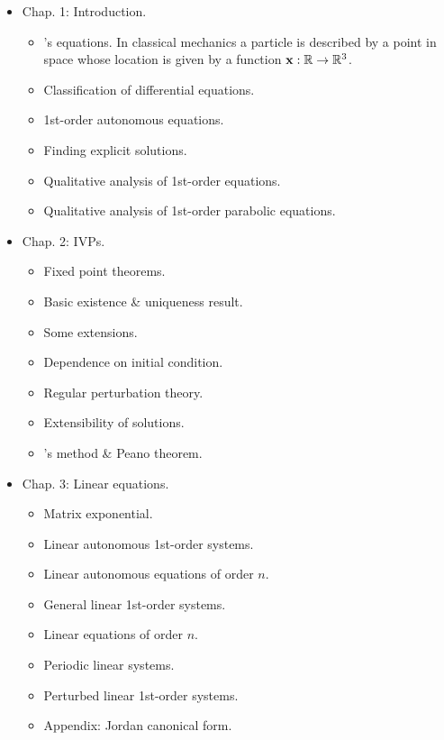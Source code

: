 \documentclass{article}
\begin{document}
\begin{enumerate}
	\begin{itemize}
		\item {\sf Chap. 1: Introduction.}
		\begin{itemize}
			\item {'s equations.} In classical mechanics a particle is described by a point in space whose location is given by a function ${\bf x}:\mathbb{R}\to\mathbb{R}^3$.
			\item {\sf Classification of differential equations.}
			\item {\sf 1st-order autonomous equations.}
			\item {\sf Finding explicit solutions.}
			\item {\sf Qualitative analysis of 1st-order equations.}
			\item {\sf Qualitative analysis of 1st-order parabolic equations.}
		\end{itemize}
		\item {\sf Chap. 2: IVPs.}
		\begin{itemize}
			\item {\sf Fixed point theorems.}
			\item {\sf Basic existence \& uniqueness result.}
			\item {\sf Some extensions.}
			\item {\sf Dependence on initial condition.}
			\item {\sf Regular perturbation theory.}
			\item {\sf Extensibility of solutions.}
			\item {'s method \& Peano theorem.}
		\end{itemize}
		\item {\sf Chap. 3: Linear equations.}
		\begin{itemize}
			\item {\sf Matrix exponential.}
			\item {\sf Linear autonomous 1st-order systems.}
			\item {\sf Linear autonomous equations of order $n$.}
			\item {\sf General linear 1st-order systems.}
			\item {\sf Linear equations of order $n$.}
			\item {\sf Periodic linear systems.}
			\item {\sf Perturbed linear 1st-order systems.}
			\item {\sf Appendix: Jordan canonical form.}
		\end{itemize}

\end{itemize}
\end{enumerate}
\end{document}
